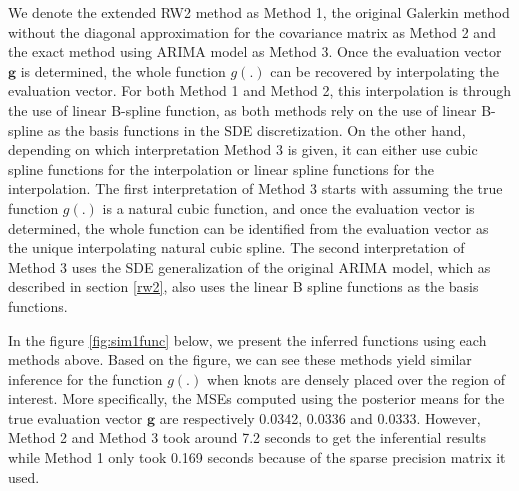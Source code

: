 \documentclass{article}
\begin{document}
We denote the extended RW2 method as Method 1, the original Galerkin method without the diagonal approximation for the covariance matrix as Method 2 and the exact method using ARIMA model as Method 3. Once the evaluation vector $\boldsymbol{g}$ is determined, the whole function $g(.)$ can be recovered by interpolating the evaluation vector. For both Method 1 and Method 2, this interpolation is through the use of linear B-spline function, as both methods rely on the use of linear B-spline as the basis functions in the SDE discretization. On the other hand, depending on which interpretation Method 3 is given, it can either use cubic spline functions for the interpolation or linear spline functions for the interpolation. The first interpretation of Method 3 starts with assuming the true function $g(.)$ is a natural cubic function, and once the evaluation vector is determined, the whole function can be identified from the evaluation vector as the unique interpolating natural cubic spline. The second interpretation of Method 3 uses the SDE generalization of the original ARIMA model, which as described in section \ref{rw2}, also uses the linear B spline functions as the basis functions.

In the figure \ref{fig:sim1func} below, we present the inferred functions using each methods above. Based on the figure, we can see these methods yield similar inference for the function $g(.)$ when knots are densely placed over the region of interest. More specifically, the MSEs computed using the posterior means for the true evaluation vector $\boldsymbol{g}$ are respectively 0.0342, 0.0336 and 0.0333. However, Method 2 and Method 3 took around 7.2 seconds to get the inferential results while Method 1 only took 0.169 seconds because of the sparse precision matrix it used. 
\end{document}
